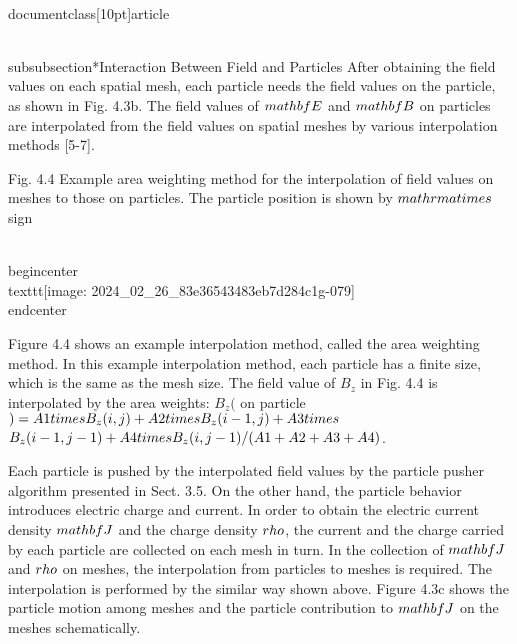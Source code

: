\\documentclass[10pt]{article}
\begin{document}
\\subsubsection*{Interaction Between Field and Particles}
After obtaining the field values on each spatial mesh, each particle needs the field values on the particle, as shown in Fig. 4.3b. The field values of $\\mathbf{E}$ and $\\mathbf{B}$ on particles are interpolated from the field values on spatial meshes by various interpolation methods [5-7].

Fig. 4.4 Example area weighting method for the interpolation of field values on meshes to those on particles. The particle position is shown by $\\mathrm{a} \\times$ sign

\\begin{center}
\\texttt{[image: 2024\_02\_26\_83e36543483eb7d284c1g-079]}
\\end{center}

Figure 4.4 shows an example interpolation method, called the area weighting method. In this example interpolation method, each particle has a finite size, which is the same as the mesh size. The field value of $B_{z}$ in Fig. 4.4 is interpolated by the area weights: $B_{z}($ on particle $)=A 1 \\times B_{z}(i, j)+A 2 \\times B_{z}(i-1, j)+A 3 \\times$ $B_{z}(i-1, j-1)+A 4 \\times B_{z}(i, j-1) /(A 1+A 2+A 3+A 4)$.

Each particle is pushed by the interpolated field values by the particle pusher algorithm presented in Sect. 3.5. On the other hand, the particle behavior introduces electric charge and current. In order to obtain the electric current density $\\mathbf{J}$ and the charge density $\\rho$, the current and the charge carried by each particle are collected on each mesh in turn. In the collection of $\\mathbf{J}$ and $\\rho$ on meshes, the interpolation from particles to meshes is required. The interpolation is performed by the similar way shown above. Figure 4.3c shows the particle motion among meshes and the particle contribution to $\\mathbf{J}$ on the meshes schematically.
\end{document}
